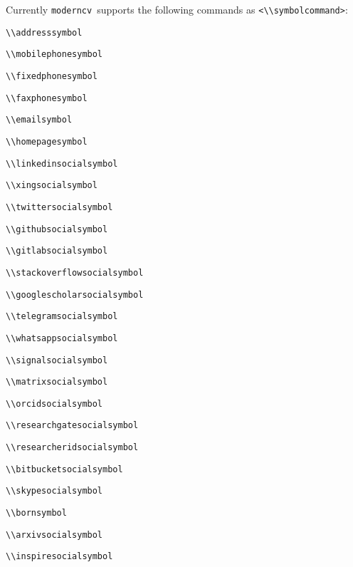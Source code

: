 \documentclass[a4paper, 11pt]{article}
\newcommand{\code}[1]{\lstinline!#1!}
\newcommand{\moderncv}{\code{moderncv}}
\newcommand{\Moderncv}{\moderncv~}
\begin{document}
Currently \Moderncv supports the following commands as \code{<\\symbolcommand>}:
\begin{itemize}
  \begin{multicols}{2}
    \item \code{\\addresssymbol}
    \item \code{\\mobilephonesymbol}
    \item \code{\\fixedphonesymbol}
    \item \code{\\faxphonesymbol}
    \item \code{\\emailsymbol}
    \item \code{\\homepagesymbol}
    \item \code{\\linkedinsocialsymbol}
    \item \code{\\xingsocialsymbol}
    \item \code{\\twittersocialsymbol}
    \item \code{\\githubsocialsymbol}
    \item \code{\\gitlabsocialsymbol}
    \item \code{\\stackoverflowsocialsymbol}
    \item \code{\\googlescholarsocialsymbol}
    \item \code{\\telegramsocialsymbol}
    \item \code{\\whatsappsocialsymbol}
    \item \code{\\signalsocialsymbol}
    \item \code{\\matrixsocialsymbol}
    \item \code{\\orcidsocialsymbol}
    \item \code{\\researchgatesocialsymbol}
    \item \code{\\researcheridsocialsymbol}
    \item \code{\\bitbucketsocialsymbol}
    \item \code{\\skypesocialsymbol}
    \item \code{\\bornsymbol}
    \item \code{\\arxivsocialsymbol}
    \item \code{\\inspiresocialsymbol}
  \end{multicols}
\end{itemize}
\end{document}
